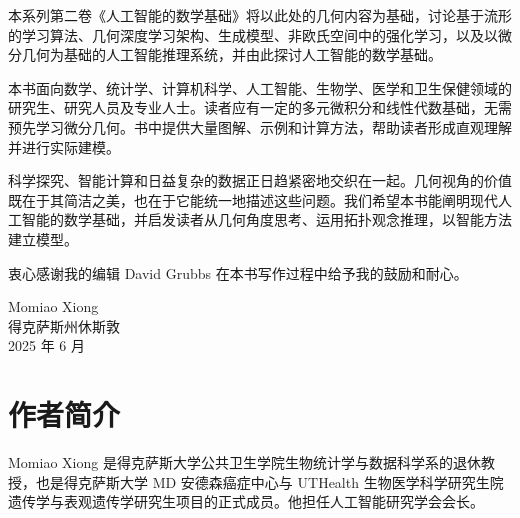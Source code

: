 本系列第二卷《人工智能的数学基础》将以此处的几何内容为基础，讨论基于流形的学习算法、几何深度学习架构、生成模型、非欧氏空间中的强化学习，以及以微分几何为基础的人工智能推理系统，并由此探讨人工智能的数学基础。

本书面向数学、统计学、计算机科学、人工智能、生物学、医学和卫生保健领域的研究生、研究人员及专业人士。读者应有一定的多元微积分和线性代数基础，无需预先学习微分几何。书中提供大量图解、示例和计算方法，帮助读者形成直观理解并进行实际建模。

科学探究、智能计算和日益复杂的数据正日趋紧密地交织在一起。几何视角的价值既在于其简洁之美，也在于它能统一地描述这些问题。我们希望本书能阐明现代人工智能的数学基础，并启发读者从几何角度思考、运用拓扑观念推理，以智能方法建立模型。

衷心感谢我的编辑 David Grubbs 在本书写作过程中给予我的鼓励和耐心。

\begin{flushright}
Momiao Xiong\\
得克萨斯州休斯敦\\
2025 年 6 月
\end{flushright}

\chapter*{作者简介}
Momiao Xiong 是得克萨斯大学公共卫生学院生物统计学与数据科学系的退休教授，也是得克萨斯大学 MD 安德森癌症中心与 UTHealth 生物医学科学研究生院遗传学与表观遗传学研究生项目的正式成员。他担任人工智能研究学会会长。

